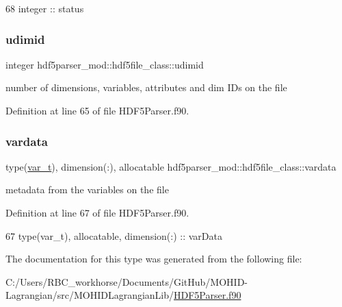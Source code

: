 \begin{DoxyCode}
68         \textcolor{keywordtype}{integer} :: status
\end{DoxyCode}
\mbox{\label{structhdf5parser__mod_1_1hdf5file__class_a62e844de1bb39611ad7145ab658fc09e}} 
\subsubsection{\texorpdfstring{udimid}{udimid}}
{\footnotesize\ttfamily integer hdf5parser\+\_\+mod\+::hdf5file\+\_\+class\+::udimid\hspace{0.3cm}{\ttfamily [private]}}



number of dimensions, variables, attributes and dim I\+Ds on the file 



Definition at line 65 of file H\+D\+F5\+Parser.\+f90.

\mbox{\label{structhdf5parser__mod_1_1hdf5file__class_a70efd0ed930593326b6d0d4383b519e6}} 
\subsubsection{\texorpdfstring{vardata}{vardata}}
{\footnotesize\ttfamily type(\mbox{\hyperlink{structhdf5parser__mod_1_1var__t}{var\+\_\+t}}), dimension(\+:), allocatable hdf5parser\+\_\+mod\+::hdf5file\+\_\+class\+::vardata\hspace{0.3cm}{\ttfamily [private]}}



metadata from the variables on the file 



Definition at line 67 of file H\+D\+F5\+Parser.\+f90.


\begin{DoxyCode}
67         \textcolor{keywordtype}{type}(var\_t), \textcolor{keywordtype}{allocatable}, \textcolor{keywordtype}{dimension(:)} :: varData
\end{DoxyCode}


The documentation for this type was generated from the following file\+:\begin{DoxyCompactItemize}
\item 
C\+:/\+Users/\+R\+B\+C\+\_\+workhorse/\+Documents/\+Git\+Hub/\+M\+O\+H\+I\+D-\/\+Lagrangian/src/\+M\+O\+H\+I\+D\+Lagrangian\+Lib/\mbox{\hyperlink{_h_d_f5_parser_8f90}{H\+D\+F5\+Parser.\+f90}}\end{DoxyCompactItemize}
